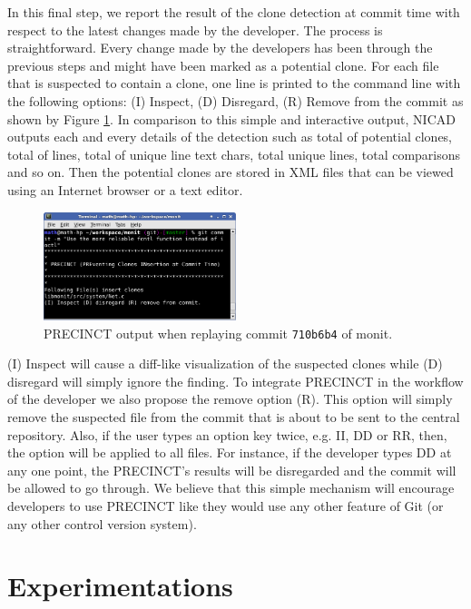 \documentclass[conference]{IEEEtran}
\begin{document}
In this final step, we report the result of the clone detection at commit time with respect to the latest changes made by the developer. The process is straightforward. Every change made by the developers has been through the previous steps and might have been marked as a potential clone. For each file that is suspected to contain a clone, one line is printed to the command line with the following options: (I) Inspect, (D) Disregard, (R) Remove from the commit as shown by Figure \ref{fig:hook}. In comparison to this simple and interactive output, NICAD outputs each and every details of the detection such as total of potential clones, total of lines, total of unique line text chars, total unique lines, total comparisons and so on.
Then the potential clones are stored in XML files that can be viewed using an Internet browser or a text editor. 

\begin{figure}
  \centering
    \includegraphics[width=0.5\textwidth]{media/commit.png}
    \caption{PRECINCT output when replaying commit \texttt{710b6b4} of monit.\label{fig:hook}}
\end{figure}

(I) Inspect will cause a diff-like visualization of the suspected clones while (D) disregard will simply ignore the finding.
To integrate PRECINCT in the workflow of the developer we also propose the  remove option (R). This option will simply remove the suspected file from the commit that is about to be sent to the central repository.
Also, if the user types an option key twice, e.g. II, DD or RR, then, the option will be applied to all files.
For instance, if the developer types DD at any one point, the PRECINCT's results will be disregarded and the commit will be allowed to go through. We believe that this simple mechanism will encourage developers to use PRECINCT like they would use any other feature of Git (or any other control version system).



\section{Experimentations}
\label{sec:Experimentations}
\end{document}
